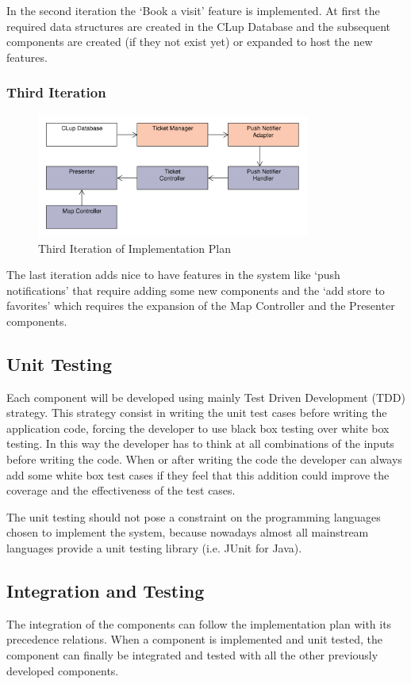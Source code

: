 In the second iteration the `Book a visit' feature is implemented. At first the required data structures are created in the CLup Database and the subsequent components are created (if they not exist yet) or expanded to host the new features.

\subsubsection{Third Iteration}
\begin{figure}[H]
    \centering
    \includegraphics[width=0.8\textwidth]{Images/Impl_Plan_3.pdf}
    \caption{\label{fig:UML_virtual_ticket_sequence}Third Iteration of Implementation Plan}
\end{figure}

The last iteration adds nice to have features in the system like `push notifications' that require adding some new components and the `add store to favorites' which requires the expansion of the Map Controller and the Presenter components.

\subsection{Unit Testing}
Each component will be developed using mainly Test Driven Development (TDD) strategy. This strategy consist in writing the unit test cases before writing the application code, forcing the developer to use black box testing over white box testing. In this way the developer has to think at all combinations of the inputs before writing the code. When or after writing the code the developer can always add some white box test cases if they feel that this addition could improve the coverage and the effectiveness of the test cases.

The unit testing should not pose a constraint on the programming languages chosen to implement the system, because nowadays almost all mainstream languages provide a unit testing library (i.e. JUnit for Java).

\subsection{Integration and Testing}
The integration of the components can follow the implementation plan with its precedence relations. When a component is implemented and unit tested, the component can finally be integrated and tested with all the other previously developed components.

